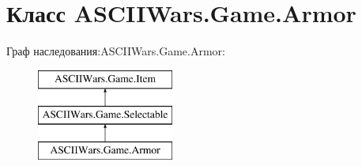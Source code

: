 \hypertarget{class_a_s_c_i_i_wars_1_1_game_1_1_armor}{}\section{Класс A\+S\+C\+I\+I\+Wars.\+Game.\+Armor}
\label{class_a_s_c_i_i_wars_1_1_game_1_1_armor}
Граф наследования\+:A\+S\+C\+I\+I\+Wars.\+Game.\+Armor\+:\begin{figure}[H]
\begin{center}
\leavevmode
\includegraphics[height=3.000000cm]{class_a_s_c_i_i_wars_1_1_game_1_1_armor}
\end{center}
\end{figure}
